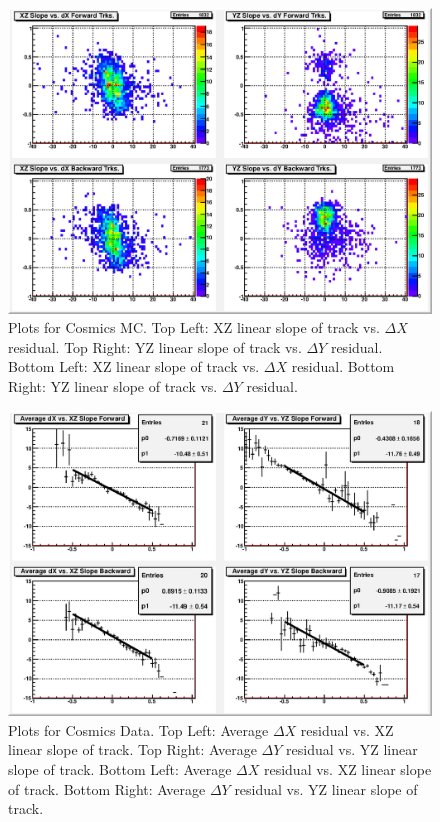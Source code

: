 \begin{figure}
  \centering
  \includegraphics[width=6in]{Figures/Appendix/cdy_mc.eps}
  \caption{Plots for Cosmics MC. Top Left: XZ linear slope of track vs. $\Delta X$ residual. Top Right: YZ linear slope of track vs. $\Delta Y$ residual. Bottom Left: XZ linear slope of track vs. $\Delta X$ residual. Bottom Right: YZ linear slope of track vs. $\Delta Y$ residual.} 
  \label{fig:cdy_mc}%
\end{figure}

\begin{figure}
  \centering
  \includegraphics[width=6in]{Figures/Appendix/cprof_data.eps}
  \caption{Plots for Cosmics Data. Top Left: Average $\Delta X$ residual vs. XZ linear slope of track. Top Right: Average $\Delta Y$ residual vs. YZ linear slope of track. Bottom Left: Average $\Delta X$ residual vs. XZ linear slope of track. Bottom Right: Average $\Delta Y$ residual vs. YZ linear slope of track.} 
  \label{fig:cprof_data}%
\end{figure}

